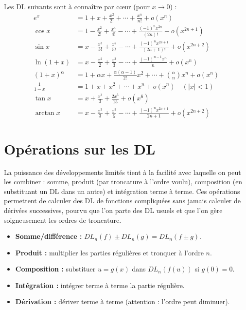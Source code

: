 \documentclass[11pt,a4paper,twoside]{book}
\begin{document}
\begin{retenirbox}
Les DL suivants sont à connaître par cœur (pour $x \to 0$) :
\begin{align*}
  e^x &= 1 + x + \frac{x^2}{2!} + \cdots + \frac{x^n}{n!} + o(x^n) \\
  \cos x &= 1 - \frac{x^2}{2!} + \frac{x^4}{4!} - \cdots + \frac{(-1)^n x^{2n}}{(2n)!} + o(x^{2n+1}) \\
  \sin x &= x - \frac{x^3}{3!} + \frac{x^5}{5!} - \cdots + \frac{(-1)^n x^{2n+1}}{(2n+1)!} + o(x^{2n+2}) \\
  \ln(1+x) &= x - \frac{x^2}{2} + \frac{x^3}{3} - \cdots + \frac{(-1)^{n-1}x^n}{n} + o(x^n) \\
  (1+x)^\alpha &= 1 + \alpha x + \frac{\alpha(\alpha-1)}{2!}x^2 + \cdots + \binom{\alpha}{n}x^n + o(x^n) \\
  \frac{1}{1-x} &= 1 + x + x^2 + \cdots + x^n + o(x^n) \quad (|x|<1) \\
  \tan x &= x + \frac{x^3}{3} + \frac{2x^5}{15} + o(x^6) \\
  \arctan x &= x - \frac{x^3}{3} + \frac{x^5}{5} - \cdots + \frac{(-1)^n x^{2n+1}}{2n+1} + o(x^{2n+2})
\end{align*}
\end{retenirbox}

\section{Opérations sur les DL}

La puissance des développements limités tient à la facilité avec laquelle on peut les combiner : somme, produit (par troncature à l'ordre voulu), composition (en substituant un DL dans un autre) et intégration terme à terme. Ces opérations permettent de calculer des DL de fonctions compliquées sans jamais calculer de dérivées successives, pourvu que l'on parte des DL usuels et que l'on gère soigneusement les ordres de troncature.

\begin{theoremebox}
\begin{itemize}
  \item \textbf{Somme/différence :} $DL_n(f) \pm DL_n(g) = DL_n(f\pm g)$.
  \item \textbf{Produit :} multiplier les parties régulières et tronquer à l'ordre $n$.
  \item \textbf{Composition :} substituer $u = g(x)$ dans $DL_n(f(u))$ si $g(0)=0$.
  \item \textbf{Intégration :} intégrer terme à terme la partie régulière.
  \item \textbf{Dérivation :} dériver terme à terme (attention : l'ordre peut diminuer).
\end{itemize}
\end{theoremebox}
\end{document}
